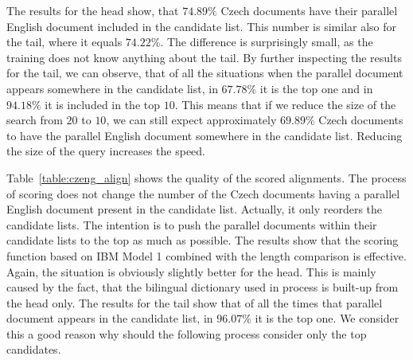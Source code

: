 The results for the head show, that $74.89\%$ Czech documents have their parallel English document included in the candidate list. This number is similar also for the tail, where it equals $74.22\%$. The difference is surprisingly small, as the training does not know anything about the tail. By further inspecting the results for the tail, we can observe, that of all the situations when the parallel document appears somewhere in the candidate list, in $67.78\%$ it is the top one and in $94.18\%$ it is included in the top $10$. This means that if we reduce the size of the search from $20$ to $10$, we can still expect approximately $69.89\%$ Czech documents to have the parallel English document somewhere in the candidate list. Reducing the size of the query increases the speed.

Table~\ref{table:czeng_align} shows the quality of the scored alignments. The process of scoring does not change the number of the Czech documents having a parallel English document present in the candidate list. Actually, it only reorders the candidate lists. The intention is to push the parallel documents within their candidate lists to the top as much as possible. The results show that the scoring function based on IBM Model 1 combined with the length comparison is effective. Again, the situation is obviously slightly better for the head. This is mainly caused by the fact, that the bilingual dictionary used in process is built-up from the head only. The results for the tail show that of all the times that parallel document appears in the candidate list, in $96.07\%$ it is the top one. We consider this a good reason why should the following process consider only the top candidates.


